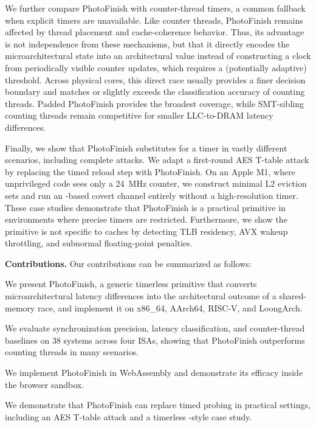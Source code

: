 \documentclass[letterpaper,twocolumn,10pt]{article} %
\newcommand{\AttackName}{PhotoFinish\xspace}
\newcommand{\PlatformCount}{38\xspace}
\begin{document}
We further compare \AttackName with counter-thread timers, a common fallback when explicit timers are unavailable.
Like counter threads, \AttackName remains affected by thread placement and cache-coherence behavior.
Thus, its advantage is not independence from these mechanisms, but that it directly encodes the microarchitectural state into an architectural value instead of constructing a clock from periodically visible counter updates, which requires a (potentially adaptive) threshold.
Across physical cores, this direct race usually provides a finer decision boundary and matches or slightly exceeds the classification accuracy of counting threads.
Padded \AttackName provides the broadest coverage, while SMT-sibling counting threads remain competitive for smaller LLC-to-DRAM latency differences.

Finally, we show that \AttackName substitutes for a timer in vastly different scenarios, including complete attacks.
We adapt a first-round AES T-table attack by replacing the timed reload step with \AttackName.
On an Apple M1, where unprivileged code sees only a \SI{24}{\mega\hertz} counter, we construct minimal L2 eviction sets and run an \EvictReload-based covert channel entirely without a high-resolution timer.
These case studies demonstrate that \AttackName is a practical primitive in environments where precise timers are restricted.
Furthermore, we show the primitive is not specific to caches by detecting TLB residency, AVX wakeup throttling, and subnormal floating-point penalties.

\textbf{Contributions.} Our contributions can be summarized as follows:
\begin{compactitem}
  \item We present \AttackName, a generic timerless primitive that converts microarchitectural latency differences into the architectural outcome of a shared-memory race, and implement it on x86\_64, AArch64, RISC-V, and LoongArch.

  \item We evaluate synchronization precision, latency classification, and counter-thread baselines on \PlatformCount systems across four ISAs, showing that \AttackName outperforms counting threads in many scenarios.

  \item We implement \AttackName in WebAssembly and demonstrate its efficacy inside the browser sandbox.

  \item We demonstrate that \AttackName can replace timed probing in practical settings, including an AES T-table attack and a timerless \EvictReload-style case study.
\end{compactitem}
\end{document}
